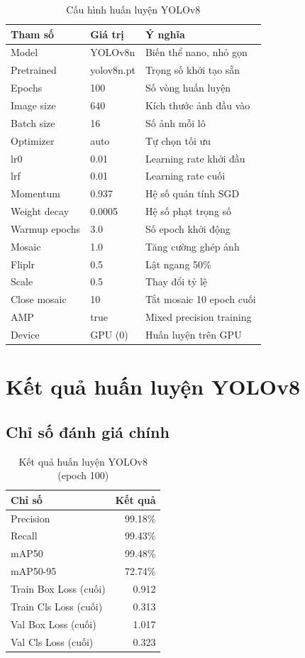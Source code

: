 \documentclass[a4paper,14pt]{extreport}
\begin{document}
\begin{table}[H]
\centering
\caption{Cấu hình huấn luyện YOLOv8}
\label{tab:cau_hinh_train}
\begin{tabular}{lll}
\toprule
\textbf{Tham số} & \textbf{Giá trị} & \textbf{Ý nghĩa} \\
\midrule
Model & YOLOv8n & Biến thể nano, nhỏ gọn \\
Pretrained & yolov8n.pt & Trọng số khởi tạo sẵn \\
Epochs & 100 & Số vòng huấn luyện \\
Image size & 640 & Kích thước ảnh đầu vào \\
Batch size & 16 & Số ảnh mỗi lô \\
Optimizer & auto & Tự chọn tối ưu \\
lr0 & 0.01 & Learning rate khởi đầu \\
lrf & 0.01 & Learning rate cuối \\
Momentum & 0.937 & Hệ số quán tính SGD \\
Weight decay & 0.0005 & Hệ số phạt trọng số \\
Warmup epochs & 3.0 & Số epoch khởi động \\
Mosaic & 1.0 & Tăng cường ghép ảnh \\
Fliplr & 0.5 & Lật ngang 50\% \\
Scale & 0.5 & Thay đổi tỷ lệ \\
Close mosaic & 10 & Tắt mosaic 10 epoch cuối \\
AMP & true & Mixed precision training \\
Device & GPU (0) & Huấn luyện trên GPU \\
\bottomrule
\end{tabular}
\end{table}

\section{Kết quả huấn luyện YOLOv8}

\subsection{Chỉ số đánh giá chính}

\begin{table}[H]
\centering
\caption{Kết quả huấn luyện YOLOv8 (epoch 100)}
\label{tab:kq_yolo}
\begin{tabular}{lr}
\toprule
\textbf{Chỉ số} & \textbf{Kết quả} \\
\midrule
Precision & 99.18\% \\
Recall & 99.43\% \\
mAP50 & 99.48\% \\
mAP50-95 & 72.74\% \\
Train Box Loss (cuối) & 0.912 \\
Train Cls Loss (cuối) & 0.313 \\
Val Box Loss (cuối) & 1.017 \\
Val Cls Loss (cuối) & 0.323 \\
\bottomrule
\end{tabular}
\end{table}
\end{document}
